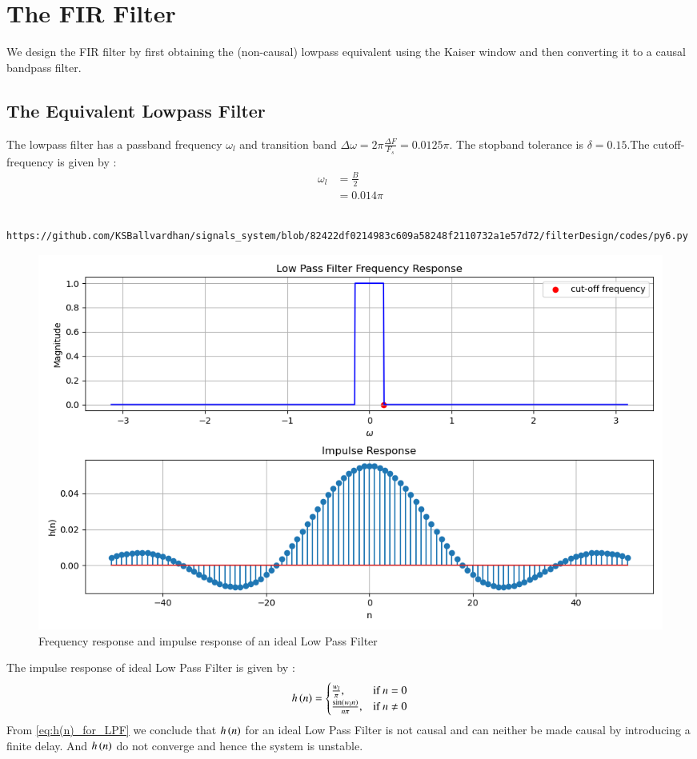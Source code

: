 \documentclass{article}
\begin{document}
	\section{The FIR Filter}
	We design the FIR filter by first obtaining the (non-causal) lowpass equivalent using the Kaiser window
	and then
	converting it to a causal bandpass filter.
	\subsection{The Equivalent Lowpass Filter}
	The lowpass filter has a passband frequency $\omega_l$ and transition band $\Delta \omega = 2\pi \frac{\Delta F}{F_s} = 0.0125\pi$.
	The stopband tolerance is $\delta=0.15$.The cutoff-frequency is given by :
	\begin{align}
		\omega_{l} &= \frac{B}{2}\\
		&= 0.014\pi
	\end{align}
	\begin{lstlisting}
		https://github.com/KSBallvardhan/signals_system/blob/82422df0214983c609a58248f2110732a1e57d72/filterDesign/codes/py6.py
	\end{lstlisting}
	\begin{figure}[htbp]
		\centering
		\includegraphics[width=1\linewidth]{figs/fig6}
		\caption{Frequency response and impulse response of an ideal Low Pass Filter}
		\label{fig:LPF_FIR_1}
	\end{figure}
	The impulse response of ideal Low Pass Filter is given by :
	\begin{align}
		h\left(n\right) = 
		\begin{cases} 
			\frac{w_l}{\pi}, & \text{if } n = 0 \\
			\frac{\sin(w_l n)}{n\pi}, & \text{if } n \neq 0
		\end{cases} \label{eq:h(n)_for_LPF}
	\end{align}
	From \eqref{eq:h(n)_for_LPF} we conclude that $h\left(n\right)$ for an ideal Low Pass Filter is not causal and can neither be made causal by introducing a finite delay. And $h\left(n\right)$ do not converge and hence the system is unstable.
\end{document}
